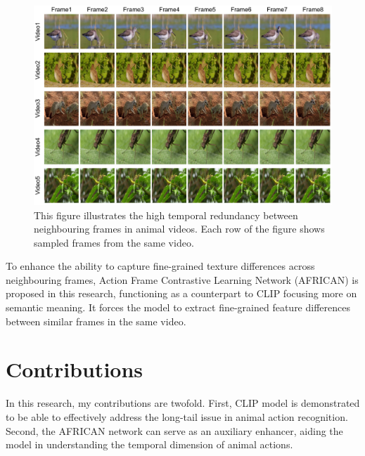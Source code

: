 \begin{figure}[ht]
    \centering
    \includegraphics[width=1\textwidth]{assets/charts/1_2_FrameComparison}
    \caption[Temporal Redundancy]{This figure illustrates the high temporal redundancy between neighbouring frames in animal videos. Each row of the figure shows sampled frames from the same video.}
    \label{fig:1_2_FrameComparison}
\end{figure}

To enhance the ability to capture fine-grained texture differences across neighbouring frames, Action Frame Contrastive Learning Network (AFRICAN) is proposed in this research, functioning as a counterpart to CLIP focusing more on semantic meaning. It forces the model to extract fine-grained feature differences between similar frames in the same video. 

\section{Contributions}
In this research, my contributions are twofold. First, CLIP model is demonstrated to be able to effectively address the long-tail issue in animal action recognition. Second, the AFRICAN network can serve as an auxiliary enhancer, aiding the model in understanding the temporal dimension of animal actions.





